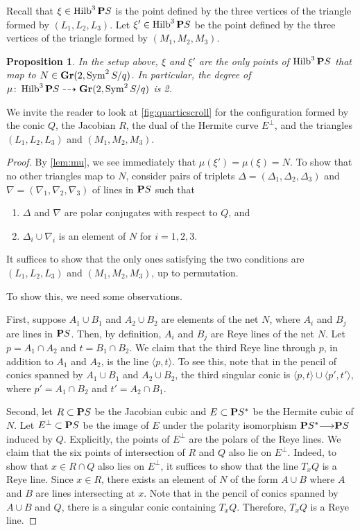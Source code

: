 \documentclass[11pt,reqno]{amsart}
\theoremstyle{plain}
\newtheorem{proposition}[theorem]{Proposition}
\theoremstyle{definition}
\theoremstyle{remark}
\numberwithin{equation}{section}
\DeclareMathOperator{\Hilb}{Hilb}
\renewcommand{\to}{{\longrightarrow}}
\numberwithin{equation}{section}
\begin{document}
Recall that $\xi \in \Hilb^3\P S$ is the point defined by the three vertices of the triangle formed by $(L_1, L_2, L_3)$.
Let $\xi' \in \Hilb^3\P S$ be the point defined by the three vertices of the triangle formed by $(M_1, M_2, M_3)$.
\begin{proposition}\label{prop:quarticscroll}
  In the setup above, $\xi$ and $\xi'$ are the only points of $\Hilb^3\P S$ that map to $N \in \Gr(2, \Sym^2S/q)$.
  In particular, the degree of $\mu \from \Hilb^3\P S \dashrightarrow \Gr(2, \Sym^2S/q)$ is 2.
\end{proposition}
We invite the reader to look at \autoref{fig:quarticscroll} for the configuration formed by the conic $Q$, the Jacobian $R$, the dual of the Hermite curve $E^\perp$, and the triangles $(L_1,L_2,L_3)$ and $(M_1,M_2,M_3)$.
\begin{proof}
  By \autoref{lem:mu}, we see immediately that $\mu(\xi') = \mu(\xi) = N$.
  To show that no other triangles map to $N$, consider pairs of triplets $\Delta = (\Delta_1, \Delta_2, \Delta_3)$ and $\nabla = (\nabla_1, \nabla_2, \nabla_3)$ of lines in $\P S$ such that
  \begin{enumerate}
  \item $\Delta$ and $\nabla$ are polar conjugates with respect to $Q$, and
  \item $\Delta_i \cup \nabla_i$ is an element of $N$ for $i = 1, 2, 3$.
  \end{enumerate}
  It suffices to show that the only ones satisfying the two conditions are $(L_1, L_2, L_3)$ and $(M_1, M_2, M_3)$, up to permutation.
  
  To show this, we need some observations.

  First, suppose $A_1 \cup B_1$ and $A_2\cup B_2$ are elements of the net $N$, where $A_i$ and $B_j$ are lines in $\P S$.
  Then, by definition, $A_i$ and $B_j$ are Reye lines of the net $N$.
  Let $p = A_1 \cap A_2$ and $t = B_1 \cap B_2$.
  We claim that the third Reye line through $p$, in addition to $A_1$ and $A_2$, is the line $\langle p, t\rangle$.
  To see this, note that in the pencil of conics spanned by $A_1 \cup B_1$ and $A_2 \cup B_2$, the third singular conic is $\langle p, t\rangle \cup \langle p', t'\rangle$, where $p' = A_1 \cap B_2$ and $t' = A_2 \cap B_1$.

  Second, let $R \subset \P S$ be the Jacobian cubic and $E \subset \P S^*$ be the Hermite cubic of $N$.
  Let $E^\perp \subset \P S$ be the image of $E$ under the polarity isomorphism $\P S^* \to \P S$ induced by $Q$.
  Explicitly, the points of $E^\perp$ are the polars of the Reye lines.
  We claim that the six points of intersection of $R$ and $Q$ also lie on $E^\perp$.
  Indeed, to show that $x \in R \cap Q$ also lies on $E^\perp$, it suffices to show that the line $T_xQ$ is a Reye line.
  Since $x \in R$, there exists an element of $N$ of the form $A\cup B$ where $A$ and $B$ are lines intersecting at $x$.
  Note that in the pencil of conics spanned by $A \cup B$ and $Q$, there is a singular conic containing $T_xQ$.
  Therefore, $T_xQ$ is a Reye line.
  

\end{proof}
\end{document}
